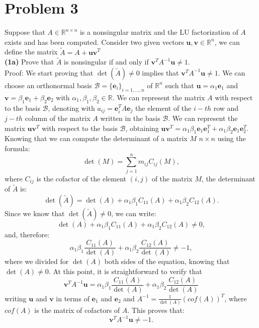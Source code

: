 \documentclass[a4paper]{report}
\newcommand{\R}{\mathbb{R}}
\numberwithin{equation}{chapter}
\begin{document}
	
	
	
\section*{Problem 3}
Suppose that $A \in \R^{n \times n}$ is a nonsingular matrix and the LU factorization of $A$ exists and has been computed. Consider two given vectors $\textbf{u},\textbf{v}\in \R^n$, we can define the matrix $\tilde{A} = A + \textbf{u}\textbf{v}^T$\\
\textbf{(1a)} Prove that $\tilde{A}$ is nonsingular if and only if $\textbf{v}^TA^{-1}\textbf{u} \neq 1$.\\
Proof: We start proving that $\det(\tilde{A})\neq 0 $ implies that $\textbf{v}^TA^{-1}\textbf{u} \neq 1$. We can choose an orthonormal basis $\mathcal{B} =\{\mathbf{e}_i\}_{i=1,\dots,n}$ of $\R^n$ such that $\mathbf{u} = \alpha_1 \mathbf{e}_1$ and $\mathbf{v} = \beta_1 \mathbf{e}_1 + \beta_2 \mathbf{e}_2$ with $\alpha_1, \beta_1, \beta_2 \in \R$. We can represent the matrix $A$ with respect to the basis $\mathcal{B}$, denoting with $a_{ij} = \textbf{e}^T_i A \textbf{e}_j $  the element of the $i-th$ row and $j-th$ column of the matrix $A$ written in the basis $\mathcal{B}$. We can represent the matrix $ \textbf{u}\textbf{v}^T$ with respect to the basis $\mathcal{B}$, obtaining $\textbf{u}\textbf{v}^T = \alpha_1 \beta_1 \textbf{e}_1 \textbf{e}_1^T +  \alpha_1 \beta_2 \textbf{e}_1 \textbf{e}_2^T$. Knowing that we can compute the determinant of a matrix $M$ $n\times n$ using the formula:
\begin{equation}\label{key}
	\det(M) = \sum_{j=1}^{n} m_{ij} C_{ij}(M),
\end{equation}
where $C_{ij}$ is the cofactor of the element $(i,j)$ of the matrix $M$, the determinant of $\tilde{A}$ is:
\begin{equation}\label{key}
	\det(\tilde{A}) = \det(A) + \alpha_1 \beta_1 C_{11}(A) + \alpha_1 \beta_2 C_{12}(A).
\end{equation}
Since we know that $ \det(\tilde{A}) \neq 0$, we can write:
\begin{equation}\label{key}
	 \det(A) + \alpha_1 \beta_1 C_{11}(A) + \alpha_1 \beta_2 C_{12}(A) \neq 0,
\end{equation}
and, therefore:
\begin{equation}\label{key}
	 \alpha_1 \beta_1 \frac{C_{11}(A)}{\det(A)} + \alpha_1 \beta_2 \frac{C_{12}(A)}{\det(A)} \neq -1,
\end{equation}
where we divided for $\det(A)$ both sides of the equation, knowing that $\det(A) \neq 0$. At this point, it is straightforward to verify that 
\begin{equation}\label{key}
	\textbf{v}^T A^{-1} \textbf{u} = \alpha_1 \beta_1 \frac{C_{11}(A)}{\det(A)} + \alpha_1 \beta_2 \frac{C_{12}(A)}{\det(A)}
\end{equation}
writing $\textbf{u}$ and $\textbf{v}$ in terms of $\textbf{e}_1$ and $\textbf{e}_2$ and $A^{-1} = \frac{1}{\det(A)} (cof(A))^T$, where $cof(A)$ is the matrix of cofactors of $A$. This proves that:
\begin{equation}\label{key}
	\textbf{v}^T A^{-1} \textbf{u} \neq -1.
\end{equation}
\end{document}
